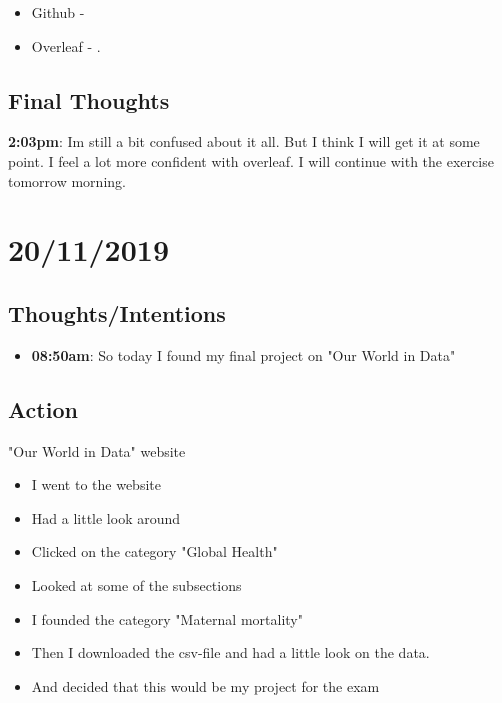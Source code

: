 \documentclass{article}
\begin{document}
\begin{itemize}
    \item Github - 
    \item Overleaf - . 
\end{itemize}

\subsection{Final Thoughts}
\begin{itemize}
\textbf{2:03pm}: Im still a bit confused about it all. But I think I will get it at some point. I feel a lot more confident with overleaf. I will continue with the exercise tomorrow morning.  
\end{itemize}\bigskip


\section{20/11/2019}
\subsection{Thoughts/Intentions}

\begin{itemize}
\item \textbf{08:50am}: So today I found my final project on "Our World in Data" 
\end{itemize}

\subsection{Action}

"Our World in Data" website 

\begin{itemize}
    \item I went to the website 
    \item Had a little look around 
    \item Clicked on the category "Global Health"  
    \item Looked at some of the subsections  
    \item I founded the category "Maternal mortality"
    \item Then I downloaded the csv-file and had a little look on the data. 
    \item And decided that this would be my project for the exam 
\end{itemize}
\end{document}
